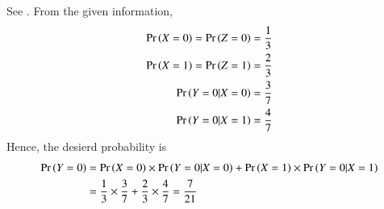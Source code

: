 See .
From the given information,
\begin{align}
\Pr\left(X=0\right) = \Pr\left(Z=0\right) 
         &= \frac{1}{3} \\
\Pr\left(X=1\right) = \Pr\left(Z=1\right) 
         &= \frac{2}{3}\\
\Pr\left( Y=0 | X=0\right) &= \frac{3}{7} \\
\Pr\left( Y=0 | X=1\right) &= \frac{4}{7}     
\end{align}
Hence, the desierd probability is
\begin{align}
\Pr\left(Y=0\right) &= \Pr\left(X=0\right) \times \Pr\left( Y=0 | {X=0}\right) + \Pr\left(X=1\right) \times \Pr\left( Y=0 | {X=1}\right) \\
                                 &= \frac{1}{3} \times \frac{3}{7} + \frac{2}{3} \times \frac{4}{7} 
                                 = \frac{7}{21} 
\end{align}
\begin{table}[!htb]  
\centering                       
  
\caption{}
\label{tab:exemplar/12/13/3/45/}
\end{table} 
